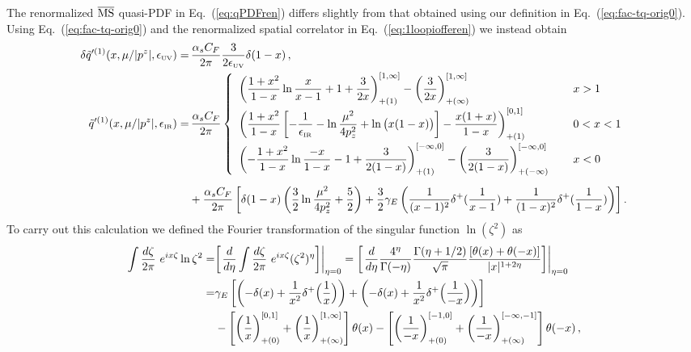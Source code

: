 \documentclass[prd,aps,twocolumn,preprintnumbers,showpacs,nofootinbib,superscriptaddress,notitlepage]{revtex4-1}
\newcommand{\nn}{\nonumber}
\newcommand{\spcorr}{spatial correlator\xspace}
\DeclareRobustCommand{\eq}[1]{Eq.~(\ref{eq:#1})}
\begin{document}
\begin{widetext}
The renormalized $\overline{\rm MS}$ quasi-PDF in Eq.~(\ref{eq:qPDFren}) differs slightly from that obtained using our definition in Eq.~(\ref{eq:fac-tq-orig0}). Using Eq.~(\ref{eq:fac-tq-orig0}) and the renormalized \spcorr in \eq{1loopiofferen} we instead obtain
\begin{align}\label{eq:qPDFft}
\delta \tilde{q}'^{(1)}(x,\mu/|p^z|,\epsilon_{\mbox{\tiny UV}})
=&\,  {\alpha_sC_F\over 2\pi} {3\over 2\epsilon_{\mbox{\tiny UV}}}\delta(1-x)\,, \\
\tilde{q}'^{(1)}(x,\mu/|p^z|,\epsilon_{\mbox{\tiny IR}})
=&\, {\alpha_sC_F\over 2\pi}\left\{
\begin{array}{ll}
\displaystyle \left({1+x^2\over 1-x}\ln {x\over x-1} + 1 + {3\over 2x}\right)^{[1,\infty]}_{+(1)}- \left({3\over 2x}\right)^{[1,\infty]}_{+(\infty)} &\, x>1\nn\\[10pt]
\displaystyle \left({1+x^2\over 1-x}\left[- {1\over \epsilon_{\mbox{\tiny IR}}} - \ln{\mu^2\over 4p_z^2} + \ln\big(x(1-x)\big)\right] - {x(1+x)\over 1-x}\right)^{[0,1]}_{+(1)}  &\, 0<x<1\nn\\[10pt]
\displaystyle  \left(-{1+x^2\over 1-x}\ln {-x\over 1-x} - 1 + {3\over 2(1-x)}\right)^{[-\infty,0]}_{+(1)} - \left({3\over 2(1-x)}\right)^{[-\infty,0]}_{+(-\infty)} \quad &\, x<0
\end{array}\right.\nn\\[5pt]
& + {\alpha_sC_F\over 2\pi}\left[\delta(1-x)\left( {3\over2}\ln{\mu^2\over 4p_z^2} + {5\over2}\right) +{3\over2}\gamma_E\left({1\over(x-1)^2}\delta^+({1\over x-1}) + {1\over(1-x)^2}\delta^+({1\over 1-x})\right)\right]
 \nn .
\end{align}
To carry out this calculation we defined the Fourier transformation of the singular function $\ln(\zeta^2)$ as
\begin{align} \label{eq:subtlety}
\int {d\zeta\over 2\pi}\ e^{i x \zeta} \ln\zeta^2
= & \biggl[ \left.{d\over d\eta} \int {d\zeta\over 2\pi}\ e^{i x \zeta} (\zeta^2)^\eta \biggr] \right|_{\eta=0}
=\biggl[ \left.{d\over d\eta} {4^\eta\over \Gamma(-\eta)} {\Gamma(\eta+1/2)\over \sqrt{\pi}} {[\theta(x)+\theta(-x)]\over |x|^{1+2\eta}} \biggr]
\right|_{\eta=0}\nn\\
=& \gamma_E \left[\left(-\delta(x) + {1\over x^2} \delta^+\Big({1\over x}\Big)\right) + \left(-\delta(x) + {1\over x^2} \delta^+\Big({1\over -x}\Big)\right)\right] \nn\\
& -\left[\left({1\over x}\right)_{+(0)}^{[0,1]} + \left({1\over x}\right)_{+(\infty)}^{[1,\infty]}\right]\theta(x) - \left[\left({1\over -x}\right)_{+(0)}^{[-1,0]} + \left({1\over -x}\right)_{+(\infty)}^{[-\infty,-1]}\right]\theta(-x)\,,

\end{align}
\end{widetext}
\end{document}
